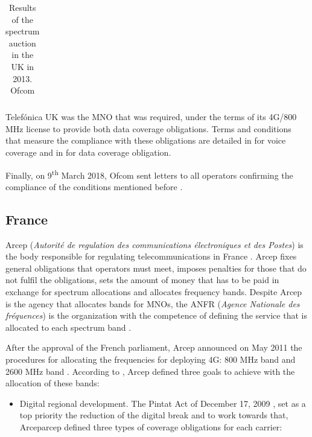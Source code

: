 {\begin{table}[H]
\begin{tabular}{p{1.42in}p{1in}p{1.36in}p{1.48in}}
\end{tabular}
\caption{Results of the spectrum auction in the UK in 2013. Ofcom \cite{2-14}}

 \end{table}



Telefónica UK was the MNO that was required, under the terms of its 4G/800 MHz license to provide both data coverage obligations. Terms and conditions that measure the compliance with these obligations are detailed in \cite{2-15} for voice coverage and in \cite{2-16} for data coverage obligation.\par

Finally, on 9\textsuperscript{th} March 2018, Ofcom sent letters to all operators confirming the compliance of the conditions mentioned before \cite{2-17}.\par

\subsection*{France}
Arcep (\textit{Autorité de regulation des communications électroniques et des Postes}) is the body responsible for regulating telecommunications in France \cite{2-18}. Arcep fixes general obligations that operators must meet, imposes penalties for those that do not fulfil the obligations, sets the amount of money that has to be paid in exchange for spectrum allocations and allocates frequency bands. Despite Arcep is the agency that allocates bands for MNOs, the ANFR (\textit{Agence Nationale des fréquences}) is the organization with the competence of defining the service that is allocated to each spectrum band \cite{2-19}.\par

After the approval of the French parliament, Arcep announced on May 2011 the procedures for allocating the frequencies for deploying 4G: 800 MHz band \cite{2-20} and 2600 MHz band \cite{2-21}. According to \cite{2-22}, Arcep defined three goals to achieve with the allocation of these bands:\par

\begin{itemize}
	\item Digital regional development. The Pintat Act of December 17, 2009 \cite{2-23}, set as a top priority the reduction of the digital break and to work towards that, Arceparcep defined three types of coverage obligations for each carrier:\par


\end{itemize}}
